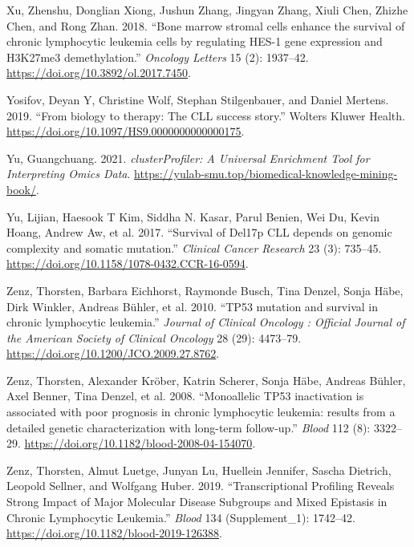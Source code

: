 \documentclass[11pt, a4paper, twosided]{book}
\newenvironment{CSLReferences}%
  {}%
  {\par}
\begin{document}
\begin{CSLReferences}{1}{0}
\leavevmode{}%
Xu, Zhenshu, Donglian Xiong, Jushun Zhang, Jingyan Zhang, Xiuli Chen, Zhizhe Chen, and Rong Zhan. 2018. {``{Bone marrow stromal cells enhance the survival of chronic lymphocytic leukemia cells by regulating HES-1 gene expression and H3K27me3 demethylation}.''} \emph{Oncology Letters} 15 (2): 1937--42. \url{https://doi.org/10.3892/ol.2017.7450}.

\leavevmode{}%
Yosifov, Deyan Y, Christine Wolf, Stephan Stilgenbauer, and Daniel Mertens. 2019. {``{From biology to therapy: The CLL success story}.''} Wolters Kluwer Health. \url{https://doi.org/10.1097/HS9.0000000000000175}.

\leavevmode{}%
Yu, Guangchuang. 2021. \emph{clusterProfiler: A Universal Enrichment Tool for Interpreting Omics Data}. \url{https://yulab-smu.top/biomedical-knowledge-mining-book/}.

\leavevmode{}%
Yu, Lijian, Haesook T Kim, Siddha N. Kasar, Parul Benien, Wei Du, Kevin Hoang, Andrew Aw, et al. 2017. {``{Survival of Del17p CLL depends on genomic complexity and somatic mutation}.''} \emph{Clinical Cancer Research} 23 (3): 735--45. \url{https://doi.org/10.1158/1078-0432.CCR-16-0594}.

\leavevmode{}%
Zenz, Thorsten, Barbara Eichhorst, Raymonde Busch, Tina Denzel, Sonja Häbe, Dirk Winkler, Andreas Bühler, et al. 2010. {``{TP53 mutation and survival in chronic lymphocytic leukemia.}''} \emph{Journal of Clinical Oncology : Official Journal of the American Society of Clinical Oncology} 28 (29): 4473--79. \url{https://doi.org/10.1200/JCO.2009.27.8762}.

\leavevmode{}%
Zenz, Thorsten, Alexander Kröber, Katrin Scherer, Sonja Häbe, Andreas Bühler, Axel Benner, Tina Denzel, et al. 2008. {``{Monoallelic TP53 inactivation is associated with poor prognosis in chronic lymphocytic leukemia: results from a detailed genetic characterization with long-term follow-up.}''} \emph{Blood} 112 (8): 3322--29. \url{https://doi.org/10.1182/blood-2008-04-154070}.

\leavevmode{}%
Zenz, Thorsten, Almut Luetge, Junyan Lu, Huellein Jennifer, Sascha Dietrich, Leopold Sellner, and Wolfgang Huber. 2019. {``{Transcriptional Profiling Reveals Strong Impact of Major Molecular Disease Subgroups and Mixed Epistasis in Chronic Lymphocytic Leukemia}.''} \emph{Blood} 134 (Supplement\_1): 1742--42. \url{https://doi.org/10.1182/blood-2019-126388}.


\end{CSLReferences}
\end{document}
